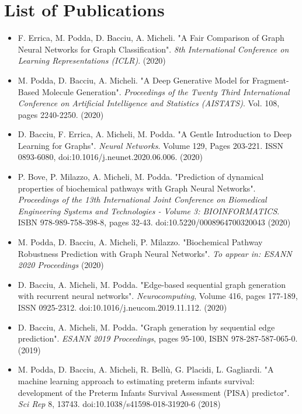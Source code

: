 \chapter{List of Publications}\label{AppendixB}

\begin{itemize}
\item F. Errica, M. Podda, D. Bacciu, A. Micheli. "A Fair Comparison of Graph Neural Networks for Graph Classification".
\textit{8th International Conference on Learning Representations (ICLR)}. (2020)
\item M. Podda, D. Bacciu, A. Micheli. "A Deep Generative Model for Fragment-Based Molecule Generation". \textit{Proceedings of the Twenty Third International Conference on Artificial Intelligence and Statistics (AISTATS)}. Vol. 108, pages 2240-2250. (2020)
\item D. Bacciu, F. Errica, A. Micheli, M. Podda. "A Gentle Introduction to Deep Learning for Graphs". \textit{Neural Networks}. Volume 129, Pages 203-221. ISSN 0893-6080, doi:10.1016/j.neunet.2020.06.006. (2020)
\item P. Bove, P. Milazzo, A. Micheli, M. Podda.
"Prediction of dynamical properties of biochemical pathways with Graph Neural Networks". \textit{Proceedings of the 13th International Joint Conference on Biomedical Engineering Systems and Technologies - Volume 3: BIOINFORMATICS}. ISBN 978-989-758-398-8, pages 32-43. doi:10.5220/0008964700320043 (2020)
\item M. Podda, D. Bacciu, A. Micheli, P. Milazzo. "Biochemical Pathway Robustness Prediction with Graph Neural Networks". \textit{To appear in: ESANN 2020 Proceedings} (2020)
\item D. Bacciu, A. Micheli, M. Podda. "Edge-based sequential graph generation with recurrent neural networks". \textit{Neurocomputing},
Volume 416, pages 177-189, ISSN 0925-2312. doi:10.1016/j.neucom.2019.11.112. (2020)
\item D. Bacciu, A. Micheli, M. Podda. "Graph generation by sequential edge prediction". \textit{ESANN 2019 Proceedings}, pages 95-100, ISBN 978-287-587-065-0. (2019)
\item M. Podda, D. Bacciu, A. Micheli, R. Bellù, G. Placidi, L. Gagliardi. "A machine learning approach to estimating preterm infants survival: development of the Preterm Infants Survival Assessment (PISA) predictor". \textit{Sci Rep} 8, 13743. doi:10.1038/s41598-018-31920-6 (2018)
\end{itemize}